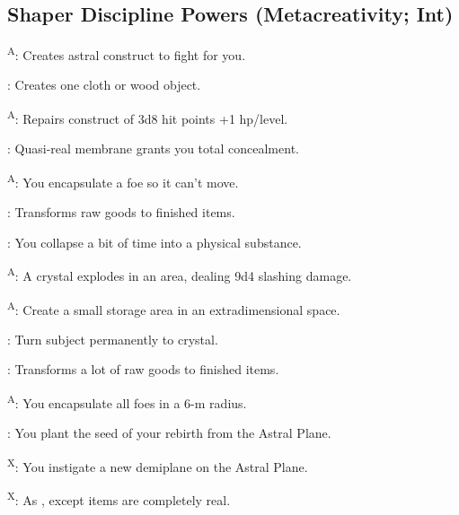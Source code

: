 \subsection{Shaper Discipline Powers {\normalsize(Metacreativity; Int)}}
\begin{enumerate*}
\item {}\textsuperscript{A}: Creates astral construct to fight for you.

: Creates one cloth or wood object.

\item {}\textsuperscript{A}: Repairs construct of 3d8 hit points +1 hp/level.
\item {}: Quasi-real membrane grants you total concealment.

\textsuperscript{A}: You encapsulate a foe so it can't move.

\item {}: Transforms raw goods to finished items.

: You collapse a bit of time into a physical substance.

\item {}\textsuperscript{A}: A crystal explodes in an area, dealing 9d4 slashing damage.

\textsuperscript{A}: Create a small storage area in an extradimensional space. %

\item {}: Turn subject permanently to crystal.

: Transforms a lot of raw goods to finished items.

\item {}\textsuperscript{A}: You encapsulate all foes in a 6-m radius.
\item {}: You plant the seed of your rebirth from the Astral Plane.
\item {}\textsuperscript{X}: You instigate a new demiplane on the Astral Plane.

\textsuperscript{X}: As , except items are completely real.
\end{enumerate*}



